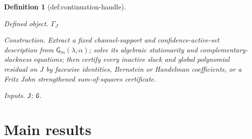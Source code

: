 \documentclass{article}
\newtheorem{definition}{Definition}
\begin{document}
\begin{definition}[def:continuation-handle]\label{def:continuation-handle}
\par\smallskip\noindent\emph{Defined object.} \(\Gamma_J\)
\par\smallskip\noindent\emph{Construction.} Extract a fixed channel-support and confidence-active-set description from \(\mathsf G_m(\lambda,\alpha)\); solve its algebraic stationarity and complementary-slackness equations; then certify every inactive slack and global polynomial residual on \(J\) by facewise identities, Bernstein or Handelman coefficients, or a Fritz John strengthened sum-of-squares certificate.
\par\smallskip\noindent\emph{Inputs.} \texttt{J}; \texttt{G}.
\end{definition}

\section{Main results}
\end{document}
